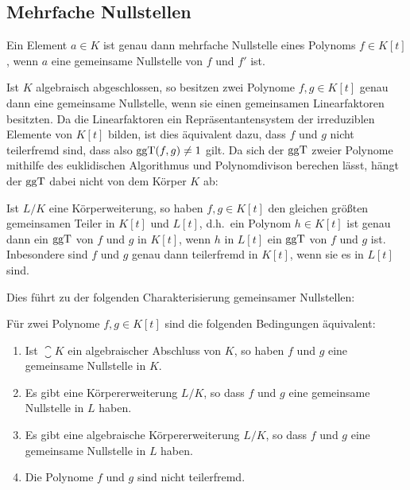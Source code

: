 \subsection{Mehrfache Nullstellen}

\begin{lemma}
  Ein Element $a \in K$ ist genau dann mehrfache Nullstelle eines Polynoms $f \in K[t]$, wenn $a$ eine gemeinsame Nullstelle von $f$ und $f'$ ist.
\end{lemma}

Ist $K$ algebraisch abgeschlossen, so besitzen zwei Polynome $f, g \in K[t]$ genau dann eine gemeinsame Nullstelle, wenn sie einen gemeinsamen Linearfaktoren besitzten.
Da die Linearfaktoren ein Repräsentantensystem der irreduziblen Elemente von $K[t]$ bilden, ist dies äquivalent dazu, dass $f$ und $g$ nicht teilerfremd sind, dass also $\operatorname{ggT}(f,g) \neq 1$ gilt.
Da sich der $\operatorname{ggT}$ zweier Polynome mithilfe des euklidischen Algorithmus und Polynomdivison berechen lässt, hängt der $\operatorname{ggT}$ dabei nicht von dem Körper $K$ ab:

\begin{lemma}
  Ist $L/K$ eine Körperweiterung, so haben $f, g \in K[t]$ den gleichen größten gemeinsamen Teiler in $K[t]$ und $L[t]$, d.h.\ ein Polynom $h \in K[t]$ ist genau dann ein $\operatorname{ggT}$ von $f$ und $g$ in $K[t]$, wenn $h$ in $L[t]$ ein $\operatorname{ggT}$ von $f$ und $g$ ist.
  Inbesondere sind $f$ und $g$ genau dann teilerfremd in $K[t]$, wenn sie es in $L[t]$ sind.
\end{lemma}

Dies führt zu der folgenden Charakterisierung gemeinsamer Nullstellen:

\begin{corollary}
  Für zwei Polynome $f, g \in K[t]$ sind die folgenden Bedingungen äquivalent:
  \begin{enumerate}
    \item
      Ist $\closure{K}$ ein algebraischer Abschluss von $K$, so haben $f$ und $g$ eine gemeinsame Nullstelle in $K$.
    \item
      Es gibt eine Körpererweiterung $L/K$, so dass $f$ und $g$ eine gemeinsame Nullstelle in $L$ haben.
    \item
      Es gibt eine algebraische Körpererweiterung $L/K$, so dass $f$ und $g$ eine gemeinsame Nullstelle in $L$ haben.
    \item
      Die Polynome $f$ und $g$ sind nicht teilerfremd.
  \end{enumerate}
\end{corollary}

